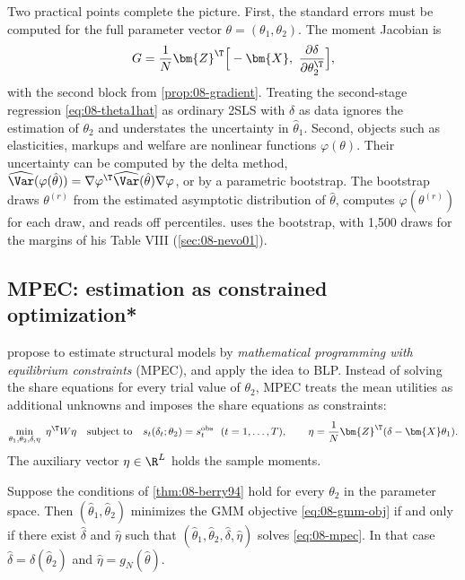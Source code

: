 Two practical points complete the picture. First, the standard errors must be computed for the full
parameter vector $\theta = (\theta_1, \theta_2)$. The moment Jacobian is
\begin{equation*}
  G = \frac{1}{N}\bm{Z}^\T\Big[-\bm{X},\ \frac{\partial \delta}{\partial \theta_2^\T}\Big],
\end{equation*}
with the second block from \cref{prop:08-gradient}. Treating the second-stage regression
\eqref{eq:08-theta1hat} as ordinary 2SLS with $\delta$ as data ignores the estimation of $\theta_2$ and
understates the uncertainty in $\hat\theta_1$. Second, objects such as elasticities, markups and welfare are
nonlinear functions $\varphi(\theta)$. Their uncertainty can be computed by the delta method,
$\widehat{\Var}(\varphi(\hat\theta)) = \nabla\varphi^\T\widehat{\Var}(\hat\theta)\nabla\varphi$, or by a
parametric bootstrap. The bootstrap draws $\theta^{(r)}$ from the estimated asymptotic distribution of
$\hat\theta$, computes $\varphi(\theta^{(r)})$ for each draw, and reads off percentiles.
\citet[pp.~319, 333]{Nevo2001} uses the bootstrap, with 1,500 draws for the margins of his Table VIII
(\cref{sec:08-nevo01}).

\subsection{MPEC: estimation as constrained optimization*}\label{sec:08-mpec}

\citet{SuJudd2012} propose to estimate structural models by \emph{mathematical programming with equilibrium
constraints} (MPEC), and \citet{DubeFoxSu2012} apply the idea to BLP. Instead of solving the share equations
for every trial value of $\theta_2$, MPEC treats the mean utilities as additional unknowns and imposes the
share equations as constraints:
\begin{equation}\label{eq:08-mpec}
  \min_{\theta_1, \theta_2, \delta, \eta}\ \eta^\T W\eta \quad\text{subject to}\quad
  s_t(\delta_t;\theta_2) = s^{\text{obs}}_t \ \ (t = 1, \dots, T), \qquad
  \eta = \frac{1}{N}\bm{Z}^\T(\delta - \bm{X}\theta_1).
\end{equation}
The auxiliary vector $\eta \in \R^L$ holds the sample moments.

\begin{proposition}\label{prop:08-mpec}
Suppose the conditions of \cref{thm:08-berry94} hold for every $\theta_2$ in the parameter space. Then
$(\hat\theta_1, \hat\theta_2)$ minimizes the GMM objective \eqref{eq:08-gmm-obj} if and only if there exist
$\hat\delta$ and $\hat\eta$ such that $(\hat\theta_1, \hat\theta_2, \hat\delta, \hat\eta)$ solves
\eqref{eq:08-mpec}. In that case $\hat\delta = \delta(\hat\theta_2)$ and $\hat\eta = g_N(\hat\theta)$.
\end{proposition}

